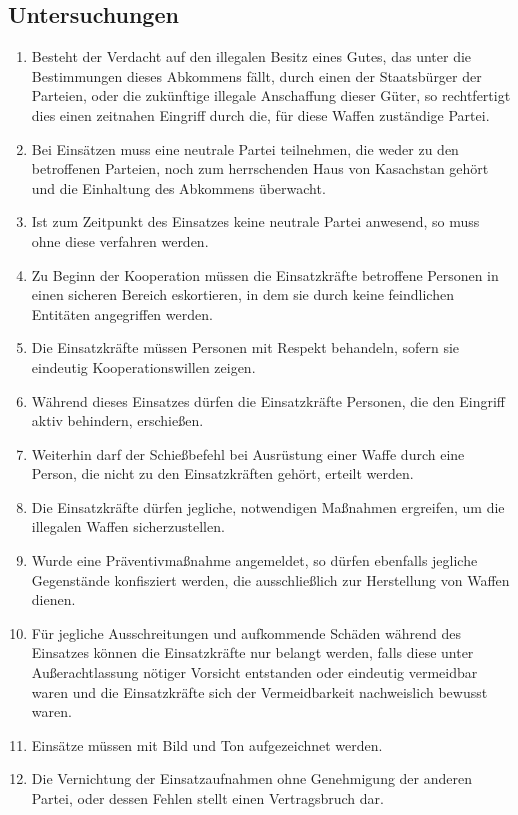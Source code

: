 \documentclass{article}
\begin{document}
\subsection{Untersuchungen}
\begin{enumerate}[(1)]
    \item Besteht der Verdacht auf den illegalen Besitz eines Gutes, das unter die Bestimmungen dieses Abkommens fällt, durch einen der Staatsbürger der Parteien, oder die zukünftige illegale Anschaffung dieser Güter, so rechtfertigt dies einen zeitnahen Eingriff durch die, für diese Waffen zuständige Partei.
    \item Bei Einsätzen muss eine neutrale Partei teilnehmen, die weder zu den betroffenen Parteien, noch zum herrschenden Haus von Kasachstan gehört und die Einhaltung des Abkommens überwacht.
    \item Ist zum Zeitpunkt des Einsatzes keine neutrale Partei anwesend, so muss ohne diese verfahren werden.
    \item Zu Beginn der Kooperation müssen die Einsatzkräfte betroffene Personen in einen sicheren Bereich eskortieren, in dem sie durch keine feindlichen Entitäten angegriffen werden.
    \item Die Einsatzkräfte müssen Personen mit Respekt behandeln, sofern sie eindeutig Kooperationswillen zeigen.
    \item Während dieses Einsatzes dürfen die Einsatzkräfte Personen, die den Eingriff aktiv behindern, erschießen.
    \item Weiterhin darf der Schießbefehl bei Ausrüstung einer Waffe durch eine Person, die nicht zu den Einsatzkräften gehört, erteilt werden.
    \item Die Einsatzkräfte dürfen jegliche, notwendigen Maßnahmen ergreifen, um die illegalen Waffen sicherzustellen.
    \item Wurde eine Präventivmaßnahme angemeldet, so dürfen ebenfalls jegliche Gegenstände konfisziert werden, die ausschließlich zur Herstellung von Waffen dienen.
    \item Für jegliche Ausschreitungen und aufkommende Schäden während des Einsatzes können die Einsatzkräfte nur belangt werden, falls diese unter Außerachtlassung nötiger Vorsicht entstanden oder eindeutig vermeidbar waren und die Einsatzkräfte sich der Vermeidbarkeit nachweislich bewusst waren.
    \item Einsätze müssen mit Bild und Ton aufgezeichnet werden.
    \item Die Vernichtung der Einsatzaufnahmen ohne Genehmigung der anderen Partei, oder dessen Fehlen stellt einen Vertragsbruch dar.
\end{enumerate}
\end{document}
